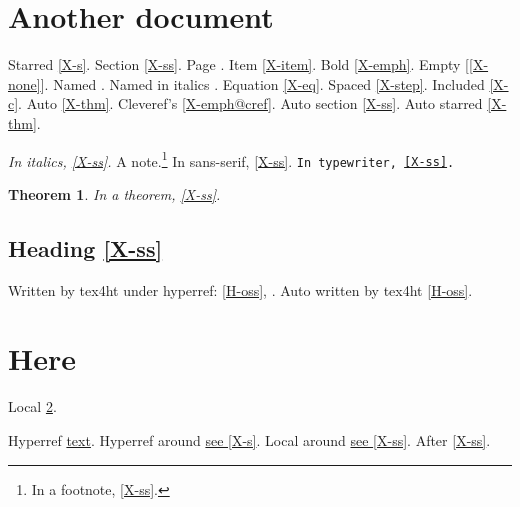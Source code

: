 \documentclass{article}
\newtheorem{theorem}{Theorem}
\begin{document}
\section{Another document}
Starred \ref*{X-s}. Section \ref{X-ss}. Page \pageref{X-front}.
Item \ref{X-item}. Bold \ref{X-emph}. Empty [\ref{X-none}].
Named . Named in italics .
Equation \eqref{X-eq}. Spaced \ref{X-step}. Included \ref{X-c}.
Auto \autoref{X-thm}. Cleveref's \ref{X-emph@cref}.
Auto section \autoref{X-ss}. Auto starred \autoref*{X-thm}.

\textit{In italics, \ref{X-ss}.}
A note.\footnote{In a footnote, \ref{X-ss}.}
\textsf{In sans-serif, \ref{X-ss}.}
\texttt{In typewriter, \ref{X-ss}.}

\begin{theorem}
In a theorem, \ref{X-ss}.
\end{theorem}

\subsection{Heading \ref*{X-ss}}
Written by tex4ht under hyperref: \ref{H-oss}, .
Auto written by tex4ht \autoref{H-oss}.

\section{Here}\label{here}
Local \ref{here}.

Hyperref \hyperref[X-ss]{text}.
Hyperref around \hyperref[X-ss]{see \ref{X-s}}.
Local around \hyperref[here]{see \ref{X-ss}}.
After \ref{X-ss}.
\end{document}
